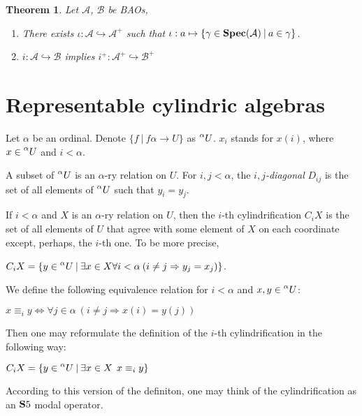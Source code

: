 \documentclass[a4paper]{article}
\theoremstyle{defin}
\theoremstyle{theorem}
\newtheorem{theorem}{Theorem}
\theoremstyle{prop}
\theoremstyle{lemma}
\theoremstyle{fact}
\theoremstyle{ex}
\theoremstyle{col}
\begin{document}
\begin{theorem} Let $\mathcal{A}$, $\mathcal{B}$ be BAOs,

\begin{enumerate}
  \item There exists $\iota : \mathcal{A} \hookrightarrow \mathcal{A}^{+}$ such that
  $\iota : a \mapsto \{ \gamma \in {\bf Spec}(\mathcal{A}) \: | \: a \in \gamma \}$.
  \item $i : \mathcal{A} \hookrightarrow \mathcal{B}$ implies
  $i^{+} : \mathcal{A}^{+} \hookrightarrow \mathcal{B}^{+}$
\end{enumerate}
\end{theorem}

\section{Representable cylindric algebras}

Let $\alpha$ be an ordinal. Denote $\{ f \: | \: f \alpha \to U\}$ as $\prescript{\alpha}{}U$. $x_i$ stands for $x(i)$, where
$x \in \prescript{\alpha}{}U$ and $i < \alpha$.

A subset of $\prescript{\alpha}{}U$ is an $\alpha$-ry relation on $U$. For $i, j < \alpha$, the \emph{$i,j$-diagonal} $D_{ij}$ is the set of all elements of $\prescript{\alpha}{}U$ such that $y_i = y_j$.

If $i < \alpha$ and $X$ is an $\alpha$-ry relation on $U$, then
the $i$-th cylindrification $C_i X$ is the set of all elements of $U$ that agree with some element of $X$ on each coordinate except, perhaps, the $i$-th one. To be more precise,
\begin{center}
$C_i X = \{ y \in \prescript{\alpha}{}U \: |
\: \exists x \in X \forall i < \alpha \: (i \neq j \Rightarrow y_j = x_j)\}$.
\end{center}
We define the following equivalence relation for $i < \alpha$ and $x, y \in \prescript{\alpha}{}U$:
\begin{center}
 $x \equiv_i y \Leftrightarrow \forall j \in \alpha \: (i \neq j \Rightarrow x(i) = y(j))$
\end{center}
Then one may reformulate the definition of the $i$-th cylindrification in the following way:

\begin{center}
 $C_i X = \{ y \in \prescript{\alpha}{}U \: | \: \exists x \in X \:\: x \equiv_i y \}$
\end{center}

According to this version of the definiton, one may think of the cylindrification as an ${\bf S}5$ modal operator.
\end{document}

